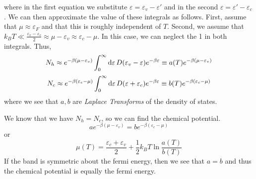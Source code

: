 where in the first equation we substitute \(\varepsilon = \varepsilon_v-\varepsilon'\) and in the second \(\varepsilon = \varepsilon' - \varepsilon_c\). We can then approximate the value of these integrals as follows. First, assume that \(\mu\approx \varepsilon_F\) and that this is roughly independent of \(T\). Second, we assume that \(k_BT\ll \frac{\varepsilon_v-\varepsilon_c}{2}\approx \mu-\varepsilon_v\approx \varepsilon_c-\mu\). In this case, we can neglect the 1 in both integrals. Thus, 
\[N_h \approx e^{-\beta(\mu-\varepsilon_v)}\int_0^\infty \d\varepsilon D(\varepsilon_v-\varepsilon)e^{-\beta\varepsilon} \equiv a(T) e^{-\beta(\mu-\varepsilon_v)}\]
\[N_c \approx e^{-\beta(\varepsilon_c-\mu)}\int_0^\infty \d\varepsilon D(\varepsilon+\varepsilon_c)e^{-\beta\varepsilon} \equiv b(T)e^{-\beta(\varepsilon_c-\mu)}\]
where we see that \(a,b\) are \emph{Laplace Transforms} of the density of states.

We know that we have \(N_h = N_c\), so we can find the chemical potential.
\[a e^{-\beta(\mu - \varepsilon_v)} = b e^{-\beta (\varepsilon_c-\mu)}\]
or
\[\mu(T) = \frac{\varepsilon_c+\varepsilon_v}{2}+\frac{1}{2}k_BT\ln\frac{a(T)}{b(T)}\]
If the band is symmetric about the fermi energy, then we see that \(a=b\) and thus the chemical potential is equally the fermi energy.

